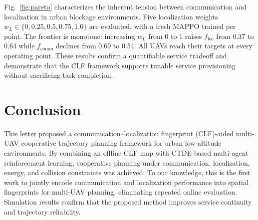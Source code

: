 \documentclass[lettersize,journal]{IEEEtran}
\begin{document}
Fig.~\ref{fig:pareto} characterizes the inherent tension between communication and localization in urban blockage environments. Five localization weights $w_L\in\{0,0.25,0.5,0.75,1.0\}$ are evaluated, with a fresh MAPPO trained per point. The frontier is monotone: increasing $w_L$ from 0 to 1 raises $f_{\mathrm{loc}}$ from 0.37 to 0.64 while $f_{\mathrm{comm}}$ declines from 0.69 to 0.54. All UAVs reach their targets at every operating point. These results confirm a quantifiable service tradeoff and demonstrate that the CLF framework supports tunable service provisioning without sacrificing task completion.

\section{Conclusion}

This letter proposed a communication--localization fingerprint (CLF)-aided multi-UAV cooperative trajectory planning framework for urban low-altitude environments. By combining an offline CLF map with CTDE-based multi-agent reinforcement learning, cooperative planning under communication, localization, energy, and collision constraints was achieved. To our knowledge, this is the first work to jointly encode communication and localization performance into spatial fingerprints for multi-UAV planning, eliminating repeated online evaluation. Simulation results confirm that the proposed method improves service continuity and trajectory reliability.
\end{document}
